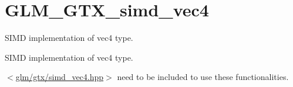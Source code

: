 \hypertarget{group__gtx__simd__vec4}{}\section{G\+L\+M\+\_\+\+G\+T\+X\+\_\+simd\+\_\+vec4}
\label{group__gtx__simd__vec4}


S\+I\+M\+D implementation of vec4 type.  


S\+I\+M\+D implementation of vec4 type. 

$<$\hyperlink{simd__vec4_8hpp}{glm/gtx/simd\+\_\+vec4.\+hpp}$>$ need to be included to use these functionalities. 